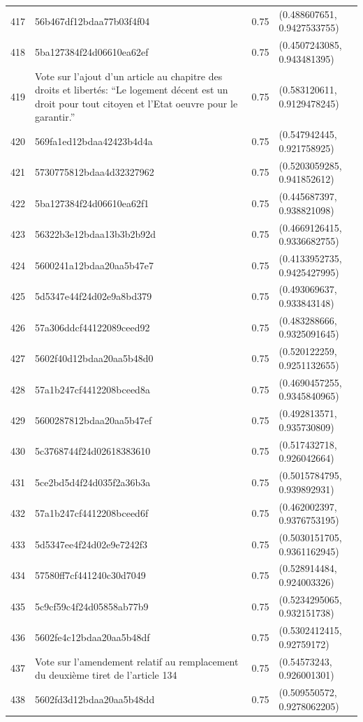 \begin{table}[ht]
\begin{tabular}{rlrl}
  417 & 56b467df12bdaa77b03f4f04 & 0.75 & (0.488607651, 0.9427533755) \\ 
  418 & 5ba127384f24d06610ea62ef & 0.75 & (0.4507243085, 0.943481395) \\ 
  419 & Vote sur l'ajout d'un article au chapitre des droits et libertés: “Le logement décent est un droit pour tout citoyen et l'Etat oeuvre pour le garantir.” & 0.75 & (0.583120611, 0.9129478245) \\ 
  420 & 569fa1ed12bdaa42423b4d4a & 0.75 & (0.547942445, 0.921758925) \\ 
  421 & 5730775812bdaa4d32327962 & 0.75 & (0.5203059285, 0.941852612) \\ 
  422 & 5ba127384f24d06610ea62f1 & 0.75 & (0.445687397, 0.938821098) \\ 
  423 & 56322b3e12bdaa13b3b2b92d & 0.75 & (0.4669126415, 0.9336682755) \\ 
  424 & 5600241a12bdaa20aa5b47e7 & 0.75 & (0.4133952735, 0.9425427995) \\ 
  425 & 5d5347e44f24d02e9a8bd379 & 0.75 & (0.493069637, 0.933843148) \\ 
  426 & 57a306ddcf44122089ceed92 & 0.75 & (0.483288666, 0.9325091645) \\ 
  427 & 5602f40d12bdaa20aa5b48d0 & 0.75 & (0.520122259, 0.9251132655) \\ 
  428 & 57a1b247cf4412208bceed8a & 0.75 & (0.4690457255, 0.9345840965) \\ 
  429 & 5600287812bdaa20aa5b47ef & 0.75 & (0.492813571, 0.935730809) \\ 
  430 & 5c3768744f24d02618383610 & 0.75 & (0.517432718, 0.926042664) \\ 
  431 & 5ce2bd5d4f24d035f2a36b3a & 0.75 & (0.5015784795, 0.939892931) \\ 
  432 & 57a1b247cf4412208bceed6f & 0.75 & (0.462002397, 0.9376753195) \\ 
  433 & 5d5347ee4f24d02e9e7242f3 & 0.75 & (0.5030151705, 0.9361162945) \\ 
  434 & 57580ff7cf441240c30d7049 & 0.75 & (0.528914484, 0.924003326) \\ 
  435 & 5c9cf59c4f24d05858ab77b9 & 0.75 & (0.5234295065, 0.932151738) \\ 
  436 & 5602fe4c12bdaa20aa5b48df & 0.75 & (0.5302412415, 0.92759172) \\ 
  437 & Vote sur l'amendement relatif au remplacement du deuxième tiret de l'article 134 & 0.75 & (0.54573243, 0.926001301) \\ 
  438 & 5602fd3d12bdaa20aa5b48dd & 0.75 & (0.509550572, 0.9278062205) \\ 

\end{tabular}
\end{table}
